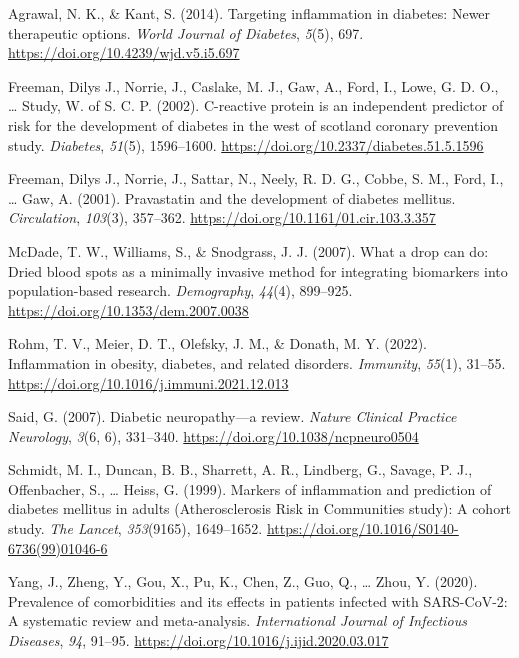 \documentclass[
  man]{apa6}
\newlength{\cslhangindent}
\newlength{\cslentryspacingunit} %
\newenvironment{CSLReferences}[2] %
 {%
  \setlength{\parindent}{0pt}
  \ifodd #1
  \let\oldpar\par
  \def\par{\hangindent=\cslhangindent\oldpar}
  \fi
  \setlength{\parskip}{#2\cslentryspacingunit}
 }%
 {}
\begin{document}
\hypertarget{refs}{}
\begin{CSLReferences}{1}{0}
\leavevmode{}%
Agrawal, N. K., \& Kant, S. (2014). Targeting inflammation in diabetes: {Newer} therapeutic options. \emph{World Journal of Diabetes}, \emph{5}(5), 697. \url{https://doi.org/10.4239/wjd.v5.i5.697}

\leavevmode{}%
Freeman, Dilys J., Norrie, J., Caslake, M. J., Gaw, A., Ford, I., Lowe, G. D. O., \ldots{} Study, W. of S. C. P. (2002). C-reactive protein is an independent predictor of risk for the development of diabetes in the west of scotland coronary prevention study. \emph{Diabetes}, \emph{51}(5), 1596--1600. \url{https://doi.org/10.2337/diabetes.51.5.1596}

\leavevmode{}%
Freeman, Dilys J., Norrie, J., Sattar, N., Neely, R. D. G., Cobbe, S. M., Ford, I., \ldots{} Gaw, A. (2001). Pravastatin and the development of diabetes mellitus. \emph{Circulation}, \emph{103}(3), 357--362. \url{https://doi.org/10.1161/01.cir.103.3.357}

\leavevmode{}%
McDade, T. W., Williams, S., \& Snodgrass, J. J. (2007). What a drop can do: {Dried} blood spots as a minimally invasive method for integrating biomarkers into population-based research. \emph{Demography}, \emph{44}(4), 899--925. \url{https://doi.org/10.1353/dem.2007.0038}

\leavevmode{}%
Rohm, T. V., Meier, D. T., Olefsky, J. M., \& Donath, M. Y. (2022). Inflammation in obesity, diabetes, and related disorders. \emph{Immunity}, \emph{55}(1), 31--55. \url{https://doi.org/10.1016/j.immuni.2021.12.013}

\leavevmode{}%
Said, G. (2007). Diabetic neuropathy---a review. \emph{Nature Clinical Practice Neurology}, \emph{3}(6, 6), 331--340. \url{https://doi.org/10.1038/ncpneuro0504}

\leavevmode{}%
Schmidt, M. I., Duncan, B. B., Sharrett, A. R., Lindberg, G., Savage, P. J., Offenbacher, S., \ldots{} Heiss, G. (1999). Markers of inflammation and prediction of diabetes mellitus in adults ({Atherosclerosis Risk} in {Communities} study): A cohort study. \emph{The Lancet}, \emph{353}(9165), 1649--1652. \url{https://doi.org/10.1016/S0140-6736(99)01046-6}

\leavevmode{}%
Yang, J., Zheng, Y., Gou, X., Pu, K., Chen, Z., Guo, Q., \ldots{} Zhou, Y. (2020). Prevalence of comorbidities and its effects in patients infected with {SARS-CoV-2}: A systematic review and meta-analysis. \emph{International Journal of Infectious Diseases}, \emph{94}, 91--95. \url{https://doi.org/10.1016/j.ijid.2020.03.017}

\end{CSLReferences}
\end{document}
